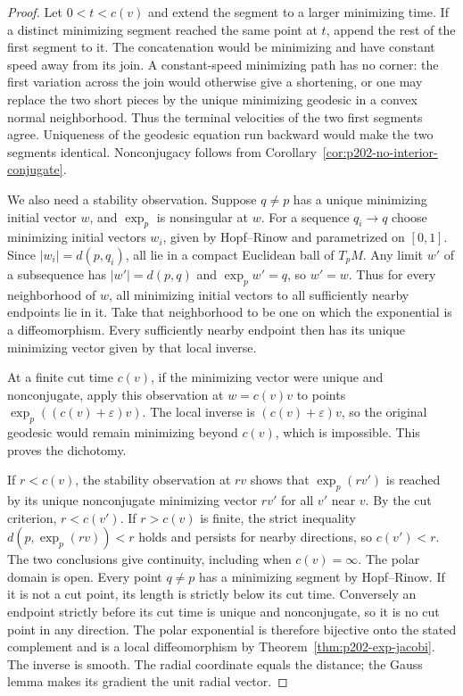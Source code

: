 \documentclass[11pt,oneside,openany]{book}
\theoremstyle{plain}
\theoremstyle{definition}
\theoremstyle{remark}
\begin{document}
\begin{proof}
Let \(0<t<c(v)\) and extend the segment to a larger minimizing
time. If a distinct minimizing segment reached the same point
at \(t\), append the rest of the first segment to it. The
concatenation would be minimizing and have constant speed
away from its join. A constant-speed minimizing path has no
corner: the first variation across the join would otherwise
give a shortening, or one may replace the two short pieces
by the unique minimizing geodesic in a convex normal
neighborhood. Thus the terminal velocities of the two first
segments agree. Uniqueness of the geodesic equation run
backward would make the two segments identical.
Nonconjugacy follows from
Corollary~\ref{cor:p202-no-interior-conjugate}.

We also need a stability observation. Suppose \(q\ne p\) has
a unique minimizing initial vector \(w\), and \(\exp_p\) is
nonsingular at \(w\). For a sequence \(q_i\to q\) choose
minimizing initial vectors \(w_i\), given by Hopf--Rinow and
parametrized on \([0,1]\). Since \(|w_i|=d(p,q_i)\), all lie
in a compact Euclidean ball of \(T_pM\). Any limit \(w'\) of
a subsequence has \(|w'|=d(p,q)\) and \(\exp_p w'=q\), so
\(w'=w\). Thus for every neighborhood of \(w\), all minimizing
initial vectors to all sufficiently nearby endpoints lie in
it. Take that neighborhood to be one on which the exponential
is a diffeomorphism. Every sufficiently nearby endpoint then
has its unique minimizing vector given by that local inverse.

At a finite cut time \(c(v)\), if the minimizing vector were
unique and nonconjugate, apply this observation at
\(w=c(v)v\) to points \(\exp_p((c(v)+\varepsilon)v)\).
The local inverse is \((c(v)+\varepsilon)v\), so the original
geodesic would remain minimizing beyond \(c(v)\), which is
impossible. This proves the dichotomy.

If \(r<c(v)\), the stability observation at \(rv\) shows that
\(\exp_p(rv')\) is reached by its unique nonconjugate
minimizing vector \(rv'\) for all \(v'\) near \(v\).
By the cut criterion, \(r<c(v')\). If \(r>c(v)\) is finite,
the strict inequality \(d(p,\exp_p(rv))<r\) holds and persists
for nearby directions, so \(c(v')<r\). The two conclusions
give continuity, including when \(c(v)=\infty\). The polar
domain is open. Every point \(q\ne p\) has a minimizing
segment by Hopf--Rinow. If it is not a cut point, its length
is strictly below its cut time. Conversely an endpoint
strictly before its cut time is unique and nonconjugate,
so it is no cut point in any direction. The polar exponential
is therefore bijective onto the stated complement and is
a local diffeomorphism by Theorem~\ref{thm:p202-exp-jacobi}.
The inverse is smooth. The radial coordinate equals the
distance; the Gauss lemma makes its gradient the unit radial
vector.
\end{proof}
\end{document}
